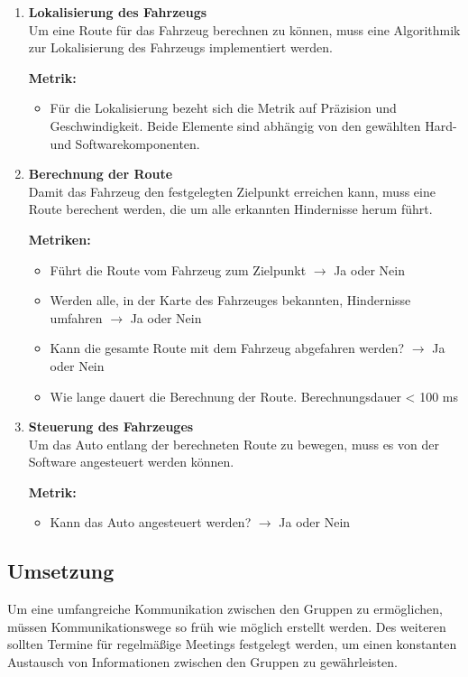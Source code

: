 \begin{enumerate}[leftmargin=*]
    \item \textbf{Lokalisierung des Fahrzeugs}\\
    Um eine Route für das Fahrzeug berechnen zu können, muss eine Algorithmik zur Lokalisierung des Fahrzeugs implementiert werden.

    \textbf{Metrik:} 
    \begin{itemize}
        \item Für die Lokalisierung bezeht sich die Metrik auf Präzision und Geschwindigkeit. 
    Beide Elemente sind abhängig von den gewählten Hard- und Softwarekomponenten. 
    \end{itemize}

    \item \textbf{Berechnung der Route}\\
    Damit das Fahrzeug den festgelegten Zielpunkt erreichen kann, muss eine Route berechent werden, die um alle erkannten Hindernisse herum führt.
    
    \textbf{Metriken:}
    \begin{itemize}
        \item Führt die Route vom Fahrzeug zum Zielpunkt $\to$ Ja oder Nein
        \item Werden alle, in der Karte des Fahrzeuges bekannten, Hindernisse umfahren $\to$ Ja oder Nein
        \item Kann die gesamte Route mit dem Fahrzeug abgefahren werden? $\to$ Ja oder Nein
        \item Wie lange dauert die Berechnung der Route. Berechnungsdauer < 100 ms
    \end{itemize}

    \item \textbf{Steuerung des Fahrzeuges}\\
    Um das Auto entlang der berechneten Route zu bewegen, muss es von der Software angesteuert werden können.

    \textbf{Metrik:}
    \begin{itemize}
        \item Kann das Auto angesteuert werden? $\to$ Ja oder Nein
    \end{itemize}
\end{enumerate}

\subsection{Umsetzung}
Um eine umfangreiche Kommunikation zwischen den Gruppen zu ermöglichen, müssen Kommunikationswege so früh wie möglich erstellt werden.
Des weiteren sollten Termine für regelmäßige Meetings festgelegt werden, um einen konstanten Austausch von Informationen zwischen den Gruppen zu gewährleisten.

